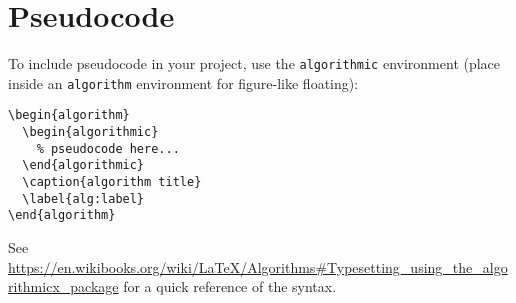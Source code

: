 
\chapter{Pseudocode}
\label{app:pseudocode}

To include pseudocode in your project, use the \texttt{algorithmic} environment (place inside an \texttt{algorithm} environment for figure-like floating):
%
\begin{verbatim}
\begin{algorithm}
  \begin{algorithmic}
    % pseudocode here...
  \end{algorithmic}
  \caption{algorithm title}
  \label{alg:label}
\end{algorithm}
\end{verbatim}



See \url{https://en.wikibooks.org/wiki/LaTeX/Algorithms#Typesetting_using_the_algorithmicx_package} for a quick reference of the syntax.
